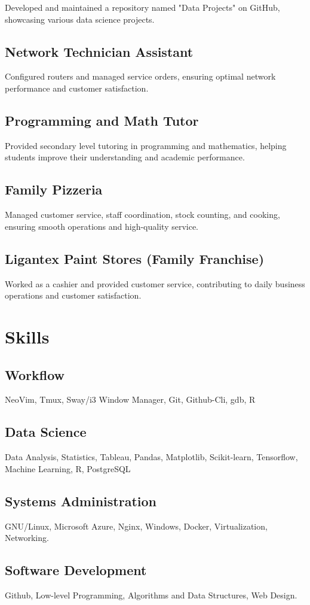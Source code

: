 \documentclass{article}
\begin{document}
Developed and maintained a repository named "Data Projects" on GitHub, showcasing various data science projects.
\subsection{Network Technician Assistant}
Configured routers and managed service orders, 
ensuring optimal network performance and customer satisfaction.
\subsection{Programming and Math Tutor}
Provided secondary level tutoring in programming and mathematics, helping students improve their understanding and academic performance.
\subsection{Family Pizzeria}
Managed customer service, staff coordination, stock counting, and cooking, ensuring smooth operations and high-quality service.
\subsection{Ligantex Paint Stores (Family Franchise)}
Worked as a cashier and provided customer service, contributing to daily business operations and customer satisfaction.

\section{Skills}
\subsection{Workflow}
NeoVim, Tmux, Sway/i3 Window Manager, Git, Github-Cli,
gdb, R
\subsection{Data Science}
Data Analysis, Statistics, Tableau, Pandas, Matplotlib, Scikit-learn, Tensorflow,
Machine Learning, R, PostgreSQL
\subsection{Systems Administration}
GNU/Linux, Microsoft Azure, Nginx, Windows,
Docker, Virtualization, Networking.
\subsection{Software Development}
Github, Low-level Programming,
Algorithms and Data Structures,
Web Design.
\end{document}

